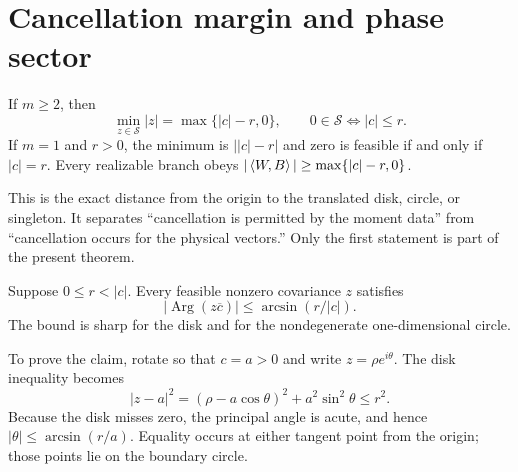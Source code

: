\section{Cancellation margin and phase sector}

\begin{corollary}\label{cor:zero}
If $m\ge2$, then
\[
 \min_{z\in\mathcal S}|z|=\max\{|c|-r,0\},
 \qquad 0\in\mathcal S\iff |c|\le r.
\]
If $m=1$ and $r>0$, the minimum is $\bigl||c|-r\bigr|$ and zero is feasible
if and only if $|c|=r$.  Every realizable branch obeys
$|\left\langle W,B\right\rangle|\ge\max\{|c|-r,0\}$.
\end{corollary}

This is the exact distance from the origin to the translated disk, circle, or
singleton.  It separates ``cancellation is permitted by the moment data'' from
``cancellation occurs for the physical vectors.''  Only the first statement is
part of the present theorem.

\begin{corollary}\label{cor:phase}
Suppose $0\le r<|c|$.  Every feasible nonzero covariance $z$ satisfies
\[
 \left|\operatorname{Arg}(z\overline c)\right|
 \le \arcsin(r/|c|).
\]
The bound is sharp for the disk and for the nondegenerate one-dimensional
circle.
\end{corollary}

To prove the claim, rotate so that $c=a>0$ and write
$z=\rho e^{i\theta}$.  The disk inequality becomes
\[
 |z-a|^2=(\rho-a\cos\theta)^2+a^2\sin^2\theta\le r^2.
\]
Because the disk misses zero, the principal angle is acute, and hence
$|\theta|\le\arcsin(r/a)$.  Equality occurs at either tangent point from the
origin; those points lie on the boundary circle.
